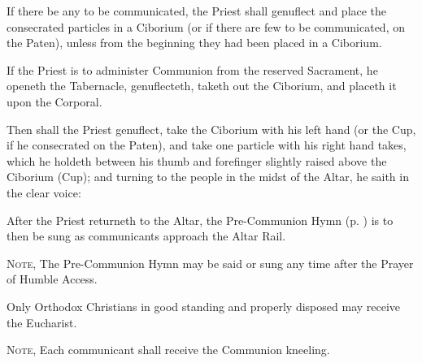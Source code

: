 \begin{rubric}
    If there be any to be communicated, the Priest shall genuflect and place the consecrated particles in a Ciborium (or if there are few to be communicated, on the Paten), unless from the beginning they had been placed in a Ciborium.
\end{rubric}
\begin{rubric}
    If the Priest is to administer Communion from the reserved Sacrament, he openeth the Tabernacle, genuflecteth, taketh out the Ciborium, and placeth it upon the Corporal.
\end{rubric}
\begin{rubric}
    Then shall the Priest genuflect, take the Ciborium with his left hand (or the Cup, if he consecrated on the Paten), and take one particle with his right hand takes, which he holdeth between his thumb and forefinger slightly raised above the Ciborium (Cup); and turning to the people in the midst of the Altar, he saith in the clear voice:
\end{rubric}
\begin{rubric}
	After the Priest returneth to the Altar, the Pre-Communion Hymn (p. \pageref{byzantine}) is to then be sung as communicants approach the Altar Rail.\par
	\textsc{Note,} The Pre-Communion Hymn may be said or sung any time after the Prayer of Humble Access.
\end{rubric}
\begin{rubric}\label{communionrubrics}
    Only Orthodox Christians in good standing and properly disposed may receive the Eucharist.\par
    \textsc{Note,} Each communicant shall receive the Communion kneeling.
\end{rubric}
